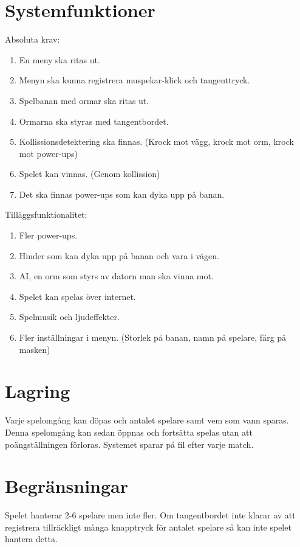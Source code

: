 \documentclass{article}
\begin{document}
\section{Systemfunktioner}
Absoluta krav:
\begin{enumerate}
\item En meny ska ritas ut.
\item Menyn ska kunna registrera muspekar-klick och tangenttryck.
\item Spelbanan med ormar ska ritas ut.
\item Ormarna ska styras med tangentbordet.
\item Kollissionsdetektering ska finnas. (Krock mot vägg, krock mot orm, krock mot power-ups)
\item Spelet kan vinnas. (Genom kollission)
\item Det ska finnas power-ups som kan dyka upp på banan.
\end{enumerate} 
Tilläggsfunktionalitet:
\begin{enumerate}
\item Fler power-ups.
\item Hinder som kan dyka upp på banan och vara i vägen.
\item AI, en orm som styrs av datorn man ska vinna mot.
\item Spelet kan spelas över internet. 
\item Spelmusik och ljudeffekter.
\item Fler inställningar i menyn. (Storlek på banan, namn på spelare, färg på masken)
\end{enumerate}

\section{Lagring}
Varje spelomgång kan döpas och antalet spelare samt vem som vann sparas. Denna spelomgång kan sedan öppnas och fortsätta spelas utan att poängställningen förloras. Systemet sparar på fil efter varje match. 

\section{Begränsningar}
Spelet hanterar 2-6 spelare men inte fler. Om tangentbordet inte klarar av att registrera tillräckligt många knapptryck för antalet spelare så kan inte spelet hantera detta. 
\end{document}
